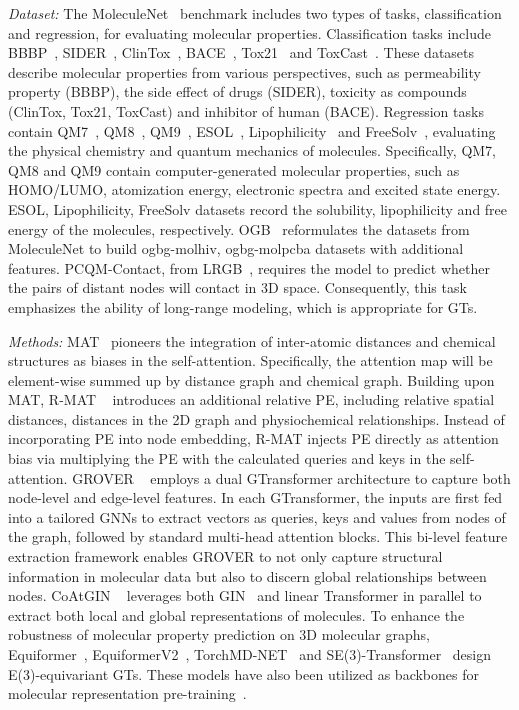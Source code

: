 \textit{Dataset:}
The MoleculeNet~\cite{wu2018moleculenet} benchmark includes two types of tasks, classification and regression, for evaluating molecular properties. Classification tasks include BBBP~\cite{martins2012bayesian}, SIDER~\cite{kuhn2016sider}, ClinTox~\cite{gayvert2016data}, BACE~\cite{subramanian2016computational}, Tox21~\cite{tox21} and ToxCast~\cite{richard2016toxcast}. These datasets describe molecular properties from various perspectives, such as permeability property (BBBP), the side effect of drugs (SIDER), toxicity as compounds (ClinTox, Tox21, ToxCast) and inhibitor of human (BACE).
Regression tasks contain QM7~\cite{blum2009970}, QM8~\cite{ramakrishnan2015electronic}, QM9~\cite{ramakrishnan2014quantum}, ESOL~\cite{delaney2004esol}, Lipophilicity~\cite{gaulton2012chembl} and FreeSolv~\cite{mobley2014freesolv}, evaluating the physical chemistry and quantum mechanics of molecules. Specifically, QM7, QM8 and QM9 contain computer-generated molecular properties, such as HOMO/LUMO, atomization energy, electronic spectra and excited state energy. ESOL, Lipophilicity, FreeSolv datasets record the solubility, lipophilicity and free energy of the molecules, respectively. 
OGB~\cite{hu2020open} reformulates the datasets from MoleculeNet to build ogbg-molhiv, ogbg-molpcba datasets with additional features.
PCQM-Contact, from LRGB~\cite{dwivedi2022long}, requires the model to predict whether the pairs of distant nodes will contact in 3D space. Consequently, this task emphasizes the ability of long-range modeling, which is appropriate for GTs. 


\textit{Methods:}
MAT~\cite{maziarka2020molecule} pioneers the integration of inter-atomic distances and chemical structures as biases in the self-attention. Specifically, the attention map will be element-wise summed up by distance graph and chemical graph. Building upon MAT, R-MAT ~\cite{maziarka2022relative} introduces an additional relative PE, including relative spatial distances, distances in the 2D graph and physiochemical relationships. Instead of incorporating PE into node embedding, R-MAT injects PE directly as attention bias via multiplying the PE with the calculated queries and keys in the self-attention. GROVER ~\cite{rong2020self} employs a dual GTransformer architecture to capture both node-level and edge-level features. In each GTransformer, the inputs are first fed into a tailored GNNs to extract vectors as queries, keys and values from nodes of the graph, followed by standard multi-head attention blocks. This bi-level feature extraction framework enables GROVER to not only capture structural information in molecular data but also to discern global relationships between nodes. CoAtGIN ~\cite{zhang2022coatgin} leverages both GIN~\cite{xu2018powerful} and linear Transformer in parallel to extract both local and global representations of molecules. 
To enhance the robustness of molecular property prediction on 3D molecular graphs, Equiformer~\cite{liao2023equiformer}, EquiformerV2~\cite{equiformer_v2}, TorchMD-NET~\cite{tholke2022torchmd} and SE(3)-Transformer~\cite{fuchs2020se3transformers} design E(3)-equivariant GTs.
These models have also been utilized as backbones for molecular representation pre-training~\cite{Coord,MolSpectra}.


